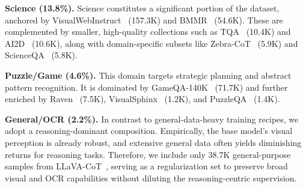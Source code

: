 \textbf{Science (13.8\%).} Science constitutes a significant portion of the dataset, anchored by VisualWebInstruct~\cite{finevision} (157.3K) and BMMR~\cite{bmmr} (54.6K). These are complemented by smaller, high-quality collections such as TQA~\cite{finevision} (10.4K) and AI2D~\cite{finevision} (10.6K), along with domain-specific subsets like Zebra-CoT~\cite{zebracot} (5.9K) and ScienceQA~\cite{finevision} (5.8K).

\textbf{Puzzle/Game (4.6\%).} This domain targets strategic planning and abstract pattern recognition. It is dominated by GameQA-140K~\cite{gameqa} (71.7K) and further enriched by Raven~\cite{finevision} (7.5K), VisualSphinx~\cite{visualsphinx} (1.2K), and PuzzleQA~\cite{puzzlevqa} (1.4K).

\textbf{General/OCR (2.2\%).} In contrast to general-data-heavy training recipes, we adopt a reasoning-dominant composition. Empirically, the base model's visual perception is already robust, and extensive general data often yields diminishing returns for reasoning tasks. Therefore, we include only 38.7K general-purpose samples from LLaVA-CoT~\cite{llava-cot}, serving as a regularization set to preserve broad visual and OCR capabilities without diluting the reasoning-centric supervision.






